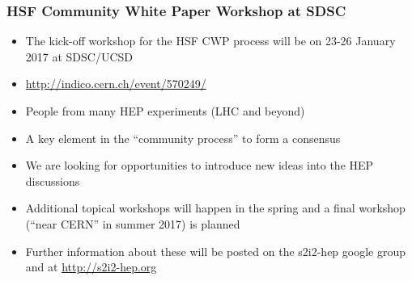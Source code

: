\begin{frame}
\frametitle{HSF Community White Paper Workshop at SDSC}

\begin{itemize}
\item The kick-off workshop for the HSF CWP process will be on 23-26 January 2017 at SDSC/UCSD
\item \url{http://indico.cern.ch/event/570249/}
\item People from many HEP experiments (LHC and beyond)
\item A key element in the ``community process'' to form a consensus
\item We are looking for opportunities to introduce new ideas into the HEP discussions
\item Additional topical workshops will happen in the spring and a final workshop (``near CERN'' in summer 2017) is planned
\item Further information about these will be posted on the s2i2-hep google group and at \url{http://s2i2-hep.org}
\end{itemize}

\end{frame}


